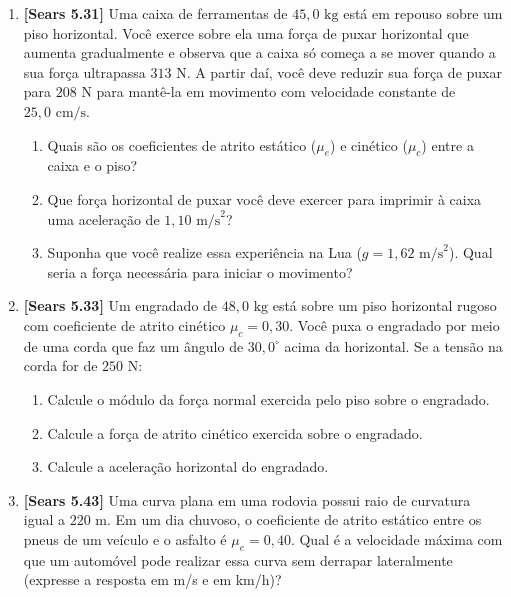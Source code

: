 \documentclass[11pt,a4paper]{article}
\begin{document}
\begin{enumerate}[label=\textbf{\arabic*.}, leftmargin=*, itemsep=0.45cm, resume]
\item \textbf{[Sears 5.31]} Uma caixa de ferramentas de $45,0\text{ kg}$ está em repouso sobre um piso horizontal. Você exerce sobre ela uma força de puxar horizontal que aumenta gradualmente e observa que a caixa só começa a se mover quando a sua força ultrapassa $313\text{ N}$. A partir daí, você deve reduzir sua força de puxar para $208\text{ N}$ para mantê-la em movimento com velocidade constante de $25,0\text{ cm/s}$.
\begin{enumerate}[label=\alph*)]
    \item Quais são os coeficientes de atrito estático ($\mu_e$) e cinético ($\mu_c$) entre a caixa e o piso?
    \item Que força horizontal de puxar você deve exercer para imprimir à caixa uma aceleração de $1,10\text{ m/s}^2$?
    \item Suponha que você realize essa experiência na Lua ($g = 1,62\text{ m/s}^2$). Qual seria a força necessária para iniciar o movimento?
\end{enumerate}

\item \textbf{[Sears 5.33]} Um engradado de $48,0\text{ kg}$ está sobre um piso horizontal rugoso com coeficiente de atrito cinético $\mu_c = 0,30$. Você puxa o engradado por meio de uma corda que faz um ângulo de $30,0^\circ$ acima da horizontal. Se a tensão na corda for de $250\text{ N}$:
\begin{enumerate}[label=\alph*)]
    \item Calcule o módulo da força normal exercida pelo piso sobre o engradado.
    \item Calcule a força de atrito cinético exercida sobre o engradado.
    \item Calcule a aceleração horizontal do engradado.
\end{enumerate}

\item \textbf{[Sears 5.43]} Uma curva plana em uma rodovia possui raio de curvatura igual a $220\text{ m}$. Em um dia chuvoso, o coeficiente de atrito estático entre os pneus de um veículo e o asfalto é $\mu_e = 0,40$. Qual é a velocidade máxima com que um automóvel pode realizar essa curva sem derrapar lateralmente (expresse a resposta em m/s e em km/h)?


\end{enumerate}
\end{document}
